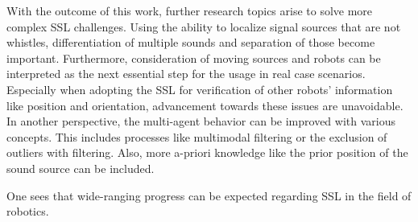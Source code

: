 With the outcome of this work, further research topics arise to solve
more complex \ac{SSL} challenges.
Using the ability to localize signal sources that are not whistles,
differentiation of multiple sounds and separation of those become important.
Furthermore, consideration of moving sources and robots can be interpreted
as the next essential step for the usage in real case scenarios.
Especially when adopting the \ac{SSL} for verification of other robots' information
like position and orientation, advancement towards these issues are unavoidable.
In another perspective, the multi-agent behavior can be improved with various
concepts.
This includes processes like multimodal filtering or the exclusion of outliers
with filtering.
Also, more a-priori  knowledge like the prior position of the sound source can be included.

One sees that wide-ranging progress can be expected regarding \ac{SSL}
in the field of  robotics.




